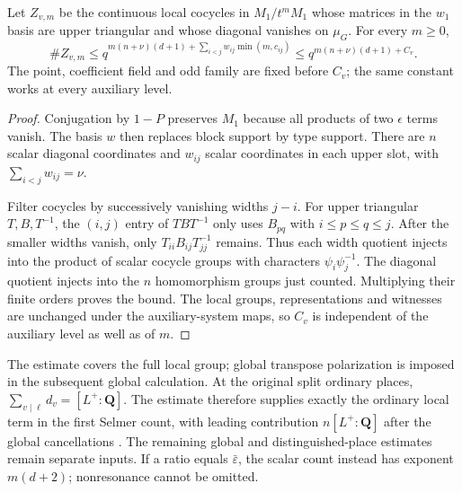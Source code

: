 \begin{proposition}
\label{prop:selmer-ordinary-local-bound}
Let $Z_{v,m}$ be the continuous local cocycles in $M_1/t^mM_1$
whose matrices in the $w_1$ basis are upper triangular and whose
diagonal vanishes on $\mu_G$. For every $m\geq0$,
\[
 \#Z_{v,m}\leq
 q^{m(n+\nu)(d+1)+\sum_{i<j}w_{ij}\min(m,c_{ij})}
 \leq q^{m(n+\nu)(d+1)+C_v}.
\]
The point, coefficient field and odd family are fixed before $C_v$;
the same constant works at every auxiliary level.
\end{proposition}

\begin{proof}
Conjugation by $1-P$ preserves $M_1$ because all products of two
$\epsilon$ terms vanish. The basis $w$ then replaces block support
by type support. There are $n$ scalar diagonal coordinates and
$w_{ij}$ scalar coordinates in each upper slot, with
$\sum_{i<j}w_{ij}=\nu$.

Filter cocycles by successively vanishing widths $j-i$.
For upper triangular $T,B,T^{-1}$, the $(i,j)$ entry of
$TBT^{-1}$ only uses $B_{pq}$ with $i\leq p\leq q\leq j$.
After the smaller widths vanish, only $T_{ii}B_{ij}T_{jj}^{-1}$
remains. Thus each width quotient injects into the product of
scalar cocycle groups with characters $\psi_i\psi_j^{-1}$.
The diagonal quotient injects into the $n$ homomorphism groups
just counted. Multiplying their finite orders proves the bound.
The local groups, representations and witnesses are unchanged
under the auxiliary-system maps, so $C_v$ is independent of the
auxiliary level as well as of $m$.
\end{proof}

The estimate covers the full local group; global transpose
polarization is imposed in the subsequent global calculation.
At the original split ordinary places,
$\sum_{v\mid\ell}d_v=[L^+:\mathbf Q]$.
The estimate therefore supplies exactly the ordinary local term
in the first Selmer count, with leading contribution
$n[L^+:\mathbf Q]$ after the global cancellations
\cite{alpo-ordinary-local-count}.
The remaining global and distinguished-place estimates remain
separate inputs. If a ratio equals $\bar\varepsilon$, the scalar
count instead has exponent $m(d+2)$; nonresonance cannot be omitted.
